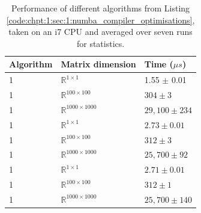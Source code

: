 \begin{table}
    \centering
    \caption{Performance of different algorithms from Listing \ref{code:chpt:1:sec:1:numba_compiler_optimisations}, taken on an i7 CPU and averaged over seven runs for statistics.}
    \begin{tabular}{l l l}
        \toprule
        Algorithm & Matrix dimension & Time ($\mu s$) \\
        \midrule
        1 & \(\mathbb{R}^{1 \times 1}\) & 1.55 $\pm$ 0.01 \\
        1 & \(\mathbb{R}^{100 \times 100}\) & $304 \pm 3$\\
        1 & \(\mathbb{R}^{1000 \times 1000}\) & $29,100 \pm 234$ \\
        \midrule
        1 & \(\mathbb{R}^{1 \times 1}\) & $2.73 \pm 0.01$ \\
        1 & \(\mathbb{R}^{100 \times 100}\) & $312 \pm 3$ \\
        1 & \(\mathbb{R}^{1000 \times 1000}\) & $25,700 \pm 92$ \\
        \midrule
        1 & \(\mathbb{R}^{1 \times 1}\) & $2.71 \pm 0.01$ \\
        1 & \(\mathbb{R}^{100 \times 100}\) & $312 \pm 1$ \\
        1 & \(\mathbb{R}^{1000 \times 1000}\) & $25,700 \pm 140$ \\
        \bottomrule
    \end{tabular}
    \label{table:chpt:1:sec:1:numba_compiler_optimisations}
\end{table}
